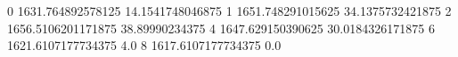 0 1631.764892578125 14.1541748046875
1 1651.748291015625 34.1375732421875
2 1656.5106201171875 38.89990234375
4 1647.629150390625 30.0184326171875
6 1621.6107177734375 4.0
8 1617.6107177734375 0.0
